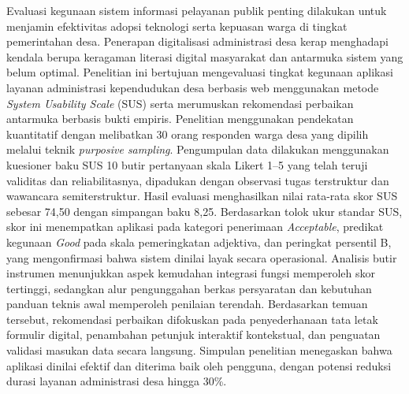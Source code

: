 \begin{abstrak}

Evaluasi kegunaan sistem informasi pelayanan publik penting dilakukan untuk menjamin efektivitas adopsi teknologi serta kepuasan warga di tingkat pemerintahan desa. Penerapan digitalisasi administrasi desa kerap menghadapi kendala berupa keragaman literasi digital masyarakat dan antarmuka sistem yang belum optimal. Penelitian ini bertujuan mengevaluasi tingkat kegunaan aplikasi layanan administrasi kependudukan desa berbasis web menggunakan metode \textit{System Usability Scale} (SUS) serta merumuskan rekomendasi perbaikan antarmuka berbasis bukti empiris. Penelitian menggunakan pendekatan kuantitatif dengan melibatkan 30 orang responden warga desa yang dipilih melalui teknik \textit{purposive sampling}. Pengumpulan data dilakukan menggunakan kuesioner baku SUS 10 butir pertanyaan skala Likert 1--5 yang telah teruji validitas dan reliabilitasnya, dipadukan dengan observasi tugas terstruktur dan wawancara semiterstruktur. Hasil evaluasi menghasilkan nilai rata-rata skor SUS sebesar 74,50 dengan simpangan baku 8,25. Berdasarkan tolok ukur standar SUS, skor ini menempatkan aplikasi pada kategori penerimaan \textit{Acceptable}, predikat kegunaan \textit{Good} pada skala pemeringkatan adjektiva, dan peringkat persentil B, yang mengonfirmasi bahwa sistem dinilai layak secara operasional. Analisis butir instrumen menunjukkan aspek kemudahan integrasi fungsi memperoleh skor tertinggi, sedangkan alur pengunggahan berkas persyaratan dan kebutuhan panduan teknis awal memperoleh penilaian terendah. Berdasarkan temuan tersebut, rekomendasi perbaikan difokuskan pada penyederhanaan tata letak formulir digital, penambahan petunjuk interaktif kontekstual, dan penguatan validasi masukan data secara langsung. Simpulan penelitian menegaskan bahwa aplikasi dinilai efektif dan diterima baik oleh pengguna, dengan potensi reduksi durasi layanan administrasi desa hingga 30\%.

\end{abstrak}
